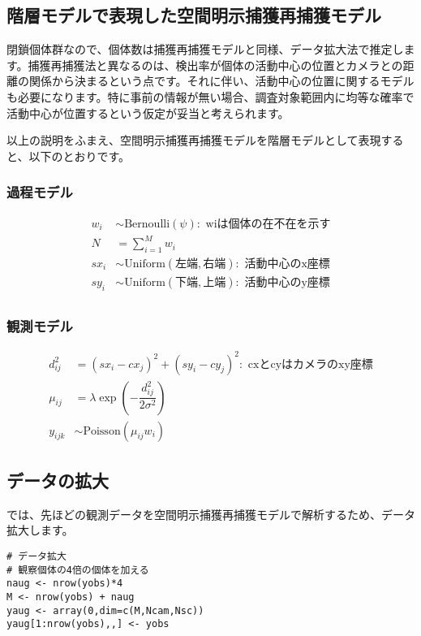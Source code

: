 \subsection{階層モデルで表現した空間明示捕獲再捕獲モデル}
閉鎖個体群なので、個体数は捕獲再捕獲モデルと同様、データ拡大法で推定します。捕獲再捕獲法と異なるのは、検出率が個体の活動中心の位置とカメラとの距離の関係から決まるという点です。それに伴い、活動中心の位置に関するモデルも必要になります。特に事前の情報が無い場合、調査対象範囲内に均等な確率で活動中心が位置するという仮定が妥当と考えられます。

以上の説明をふまえ、空間明示捕獲再捕獲モデルを階層モデルとして表現すると、以下のとおりです。
\subsubsection*{過程モデル}
\begin{align}
w_{i} &\sim \mathrm{Bernoulli}(\psi): \text{ wiは個体の在不在を示す} \\
N &= \sum_{i=1}^{M} w_{i} \\
sx_{i} &\sim \mathrm{Uniform}(\mathrm{左端}, \mathrm{右端}): \text{ 活動中心のx座標} \\
sy_{i} &\sim \mathrm{Uniform}(\mathrm{下端}, \mathrm{上端}): \text{ 活動中心のy座標} \\
\end{align}

\subsubsection*{観測モデル}
\begin{align}
d_{ij}^{2} &= (sx_{i} - cx_{j})^{2} + (sy_{i} - cy_{j})^{2}: \text{ cxとcyはカメラのxy座標}\\
\mu_{ij} &= \lambda \exp(-\dfrac{d_{ij}^{2}}{2\sigma^{2}}) \\
y_{ijk} &\sim \mathrm{Poisson}(\mu_{ij} w_{i})
\end{align}

\subsection{データの拡大}
では、先ほどの観測データを空間明示捕獲再捕獲モデルで解析するため、データ拡大します。
\begin{verbatim}
# データ拡大
# 観察個体の4倍の個体を加える
naug <- nrow(yobs)*4
M <- nrow(yobs) + naug
yaug <- array(0,dim=c(M,Ncam,Nsc))
yaug[1:nrow(yobs),,] <- yobs
\end{verbatim}

